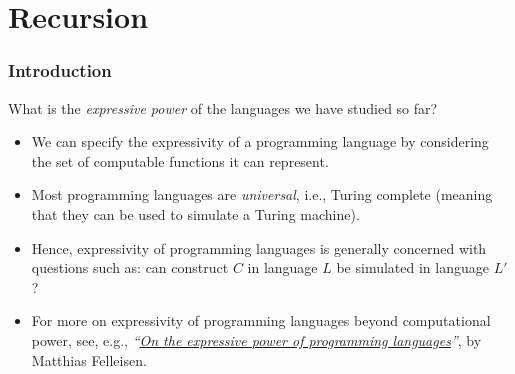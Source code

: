 \section{Recursion}



\begin{frame}
  \frametitle{Introduction}

  \begin{center}
    {\large
      What is the \emph{expressive power} of the languages we have studied so far?
    }
  \end{center}

  \pause

  \bigskip  

  \begin{itemize}[<+->]
  \item We can specify the expressivity of a programming language by
    considering the set of computable functions it can represent.
  \item Most programming languages are \emph{universal}, i.e., Turing
    complete (meaning that they can be used to simulate a Turing
    machine).
  \item Hence, expressivity of programming languages is generally
    concerned with questions such as: can construct $C$ in language
    $L$ be simulated in language $L'$?
  \item For more on expressivity of programming languages beyond
    computational power, see, e.g.,
    \emph{``\href{https://www.sciencedirect.com/science/article/pii/016764239190036W}{On
        the expressive power of programming languages}''}, by Matthias
    Felleisen.
  \end{itemize} 

\end{frame}


